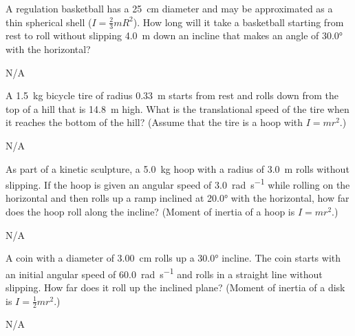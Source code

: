 


\begin{question}[ID=rotational-A-Q01,topic=rotational,difficulty=A]
    A regulation basketball has a \SI{25}{\centi\meter} diameter and may be
        approximated as a thin spherical shell ($I=\frac{2}{3}mR^2$).
    How long will it take a basketball starting from rest to roll
        without slipping \SI{4.0}{\meter} down an incline that makes
        an angle of \ang{30.0} with the horizontal?
\end{question}
\begin{solution}
    N/A
\end{solution}


\begin{question}[ID=rotational-B-Q01,topic=rotational,difficulty=B]
    A \SI{1.5}{\kilo\gram} bicycle tire of radius \SI{0.33}{\meter} starts
        from rest and rolls down from the top of a hill that is \SI{14.8}{\meter} high.
    What is the translational speed of the tire when it reaches the bottom of the hill?
    (Assume that the tire is a hoop with $I=mr^2$.)
\end{question}
\begin{solution}
    N/A
\end{solution}


\begin{question}[ID=rotational-B-Q02,topic=rotational,difficulty=B]
    As part of a kinetic sculpture, a \SI{5.0}{\kilo\gram} hoop with a radius
        of \SI{3.0}{\meter} rolls without slipping.
    If the hoop is given an angular speed of \SI{3.0}{\radian\per\second}
        while rolling on the horizontal and then rolls up a ramp inclined
        at \ang{20.0} with the horizontal, how far does the hoop roll along the incline?
    (Moment of inertia of a hoop is $I=mr^2$.)
\end{question}
\begin{solution}
    N/A
\end{solution}


\begin{question}[ID=rotational-B-Q03,topic=rotational,difficulty=B]
    A coin with a diameter of \SI{3.00}{\centi\meter} rolls up a \ang{30.0} incline.
    The coin starts with an initial angular speed of \SI{60.0}{\radian\per\second}
        and rolls in a straight line without slipping.
    How far does it roll up the inclined plane?
    (Moment of inertia of a disk is $I=\frac{1}{2}mr^2$.)
\end{question}
\begin{solution}
    N/A
\end{solution}


